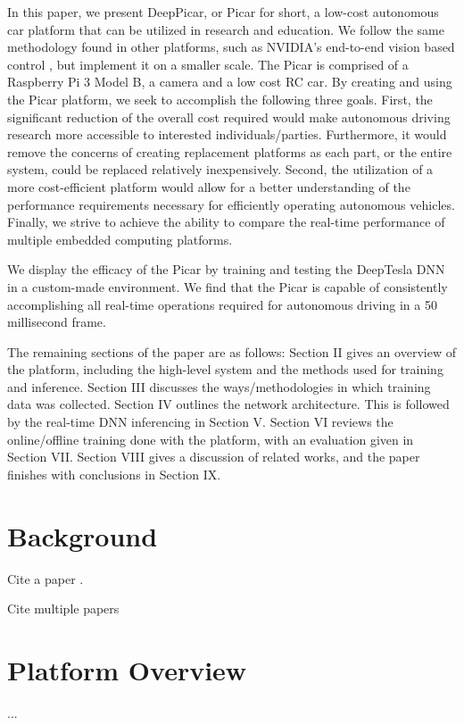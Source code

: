 \documentclass[10pt, conference]{IEEEtran}
\begin{document}
In this paper, we present DeepPicar, or Picar for short, a low-cost autonomous car platform that can be utilized in research and education. We follow the same methodology found in other platforms, such as NVIDIA’s end-to-end vision based control \cite{}, but implement it on a smaller scale. The Picar is comprised of a Raspberry Pi 3 Model B, a camera and a low cost RC car. By creating and using the Picar platform, we seek to accomplish the following three goals. First, the significant reduction of the overall cost required would make autonomous driving research more accessible to interested individuals/parties. Furthermore, it would remove the concerns of creating replacement platforms as each part, or the entire system, could be replaced relatively inexpensively. Second, the utilization of a more cost-efficient platform would allow for a better understanding of the performance requirements necessary for efficiently operating autonomous vehicles. Finally, we strive to achieve the ability to compare the real-time performance of multiple embedded computing platforms.

We display the efficacy of the Picar by training and testing the DeepTesla DNN \cite{} in a custom-made environment. We find that the Picar is capable of consistently accomplishing all real-time operations required for autonomous driving in a 50 millisecond frame.

The remaining sections of the paper are as follows: Section II gives an overview of the platform, including the high-level system and the methods used for training and inference. Section III discusses the ways/methodologies in which training data was collected. Section IV outlines the network architecture. This is followed by the real-time DNN inferencing in Section V. Section VI reviews the online/offline training done with the platform, with an evaluation given in Section VII. Section VIII gives a discussion of related works, and the paper finishes with conclusions in Section IX.

\section{Background}
Cite a paper \cite{barroso2009datacenter}.

Cite multiple papers \cite{banga99resourcecontainers,barroso2009datacenter}

\section{Platform Overview}
...
\end{document}
